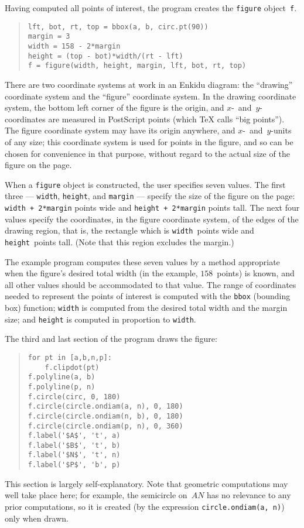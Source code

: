 \documentclass{enkidudoc}
\begin{document}
Having computed all points of interest,
the program creates the \texttt{figure} object~\texttt{f}.
\begin{quote}{\small\begin{verbatim}
lft, bot, rt, top = bbox(a, b, circ.pt(90))
margin = 3
width = 158 - 2*margin
height = (top - bot)*width/(rt - lft)
f = figure(width, height, margin, lft, bot, rt, top)
\end{verbatim}}\end{quote}
There are two coordinate systems at work in an Enkidu diagram:
the ``drawing'' coordinate system and the ``figure'' coordinate system.
In the drawing coordinate system,
the bottom left corner of the figure is the origin,
and $x$-~and~$y$-coordinates are measured in PostScript points
(which \TeX{} calls ``big points'').
The figure coordinate system may have its origin anywhere,
and $x$-~and~$y$-units of any size;
this coordinate system is used for points in the figure,
and so can be chosen for convenience in that purpose,
without regard to the actual size of the figure on the page.

When a \texttt{figure} object is constructed,
the user specifies seven values.
The first three --- \texttt{width}, \texttt{height}, and \texttt{margin}
--- specify the size of the figure on the page:
\texttt{width + 2*margin} points wide
and \texttt{height + 2*margin} points tall.
The next four values specify the coordinates,
in the figure coordinate system, of the edges of the drawing region,
that is, the rectangle which is \texttt{width}~points wide
and \texttt{height}~points tall.
(Note that this region excludes the margin.)

The example program computes these seven values
by a method appropriate when the figure's desired total width
(in the example, $158$~points) is known,
and all other values should be accommodated to that value.
The range of coordinates needed to represent
the points of interest is computed with the \texttt{bbox}
(bounding box) function;
\texttt{width} is computed from the desired total width
and the margin size;
and \texttt{height} is computed in proportion to \texttt{width}.

The third and last section of the program draws the figure:
\begin{quote}{\small\begin{verbatim}
for pt in [a,b,n,p]:
    f.clipdot(pt)
f.polyline(a, b)
f.polyline(p, n)
f.circle(circ, 0, 180)
f.circle(circle.ondiam(a, n), 0, 180)
f.circle(circle.ondiam(n, b), 0, 180)
f.circle(circle.ondiam(p, n), 0, 360)
f.label('$A$', 't', a)
f.label('$B$', 't', b)
f.label('$N$', 't', n)
f.label('$P$', 'b', p)
\end{verbatim}}\end{quote}
This section is largely self-explanatory.
Note that geometric computations may well take place here;
for example, the semicircle on~$AN$ has no relevance
to any prior computations, so it is created
(by the expression \texttt{circle.ondiam(a, n)}) only when drawn.
\end{document}
